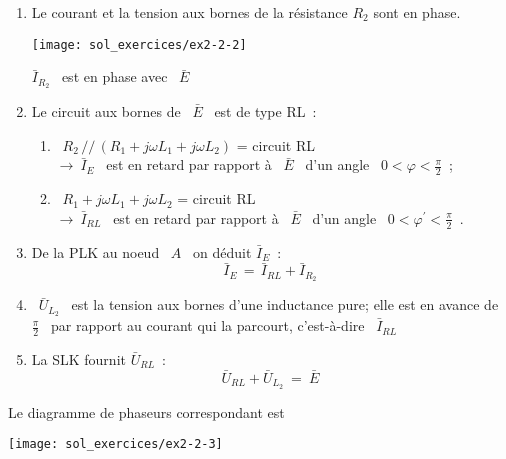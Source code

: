 \begin{enumerate}
	\item Le courant et la tension aux bornes de la résistance  $R_2$ sont en phase.
	
	\parbox[c]{3cm}{
	\begin{center}
	\texttt{[image: sol\_exercices/ex2-2-2]}
	\end{center}
	}
	\parbox[c]{8cm}{
		$\bar{I}_{R_2}$ \ est en phase avec \ $\bar{E}$}
	\item Le circuit aux bornes de \ $\bar{E}$ \ est de type RL~:
	
	\begin{enumerate}
		\item ~$R_2 \, // \, (R_1 + j\omega L_1 + j\omega L_2 )$ = circuit
		RL\\ $\rightarrow \: \bar{I}_E$ \ est en retard par rapport à \
		$\bar{E}$ \ d'un angle \ $0 < \varphi < \frac{\pi}{2}$~;
		
		\item ~$R_1 + j\omega L_1 + j\omega L_2 $ = circuit RL\\ $\rightarrow
		\: \bar{I}_{RL}$ \ est en retard par rapport à \ $\bar{E}$ \ d'un
		angle \ $0 < \varphi^{'} <  \frac{\pi}{2}$~.
	\end{enumerate}
	\item De la  PLK au noeud \ $A$ \ on déduit $\bar{I}_E$~:
	\[ \bar{I}_E \, = \, \bar{I}_{RL} + \bar{I}_{R_2}~ \]
	\item ~$\bar{U}_{L_2}$ \ est la tension aux bornes d'une inductance
	pure; elle est en avance de \ $\frac{\pi}{2}$ \ par rapport au courant qui la
	parcourt, c'est-à-dire \ $\bar{I}_{RL}$~
	\item La SLK fournit $ \bar{U}_{RL}$~:
	\[ \bar{U}_{RL} + \bar{U}_{L_2} \: = \: \bar{E}~ \]
\end{enumerate}

Le diagramme de phaseurs correspondant est
\begin{center}
	\texttt{[image: sol\_exercices/ex2-2-3]}
\end{center}

